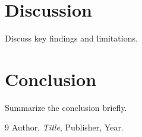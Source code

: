 \documentclass[a4paper,12pt]{jsarticle}
\begin{document}
\section{Discussion}
Discuss key findings and limitations.

\section{Conclusion}
Summarize the conclusion briefly.

\begin{thebibliography}{9}
Author, \textit{Title}, Publisher, Year.
\end{thebibliography}
\end{document}
